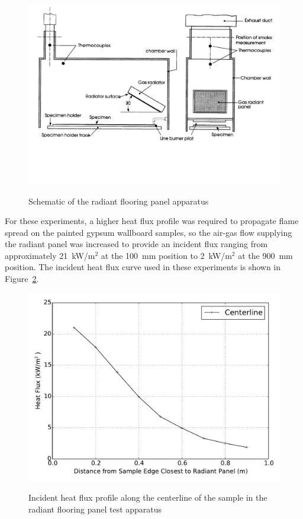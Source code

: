 \documentclass[twoside]{uocthesis}
\begin{document}
{\begin{figure}
	\centering
	\includegraphics[width=\textwidth]{../Figures/FLR_Radpan} \\
	\caption[Schematic of the radiant flooring panel apparatus]{Schematic of the radiant flooring panel apparatus}
	\label{FLR_Radpan}
\end{figure}

 For these experiments, a higher heat flux profile was required to propagate flame spread on the painted gypsum wallboard samples, so the air-gas flow supplying the radiant panel was increased to provide an incident flux ranging from approximately 21~kW/m$^2$ at the 100~mm position to 2~kW/m$^2$ at the 900~mm position.  The incident heat flux curve used in these experiments is shown in Figure~\ref{FRP_HF_Calibration}.   

\begin{figure}
	\centering
	\includegraphics[width=\textwidth]{../Figures/FRP_HF_Calibration} \\
	\caption[Incident heat flux profile in the radiant flooring panel test apparatus]{Incident heat flux profile along the centerline of the sample in the radiant flooring panel test apparatus}
	\label{FRP_HF_Calibration}
\end{figure}


}
\end{document}
